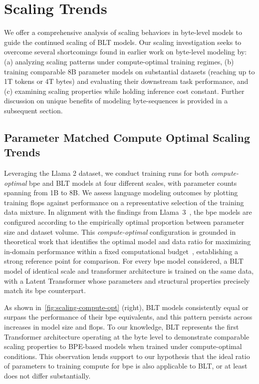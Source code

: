\section{Scaling Trends}
\label{section:scaling}

We offer a comprehensive analysis of scaling behaviors in byte-level models to guide the continued scaling of {\textsc BLT} models. Our scaling investigation seeks to overcome several shortcomings found in earlier work on byte-level modeling by: (a) analyzing scaling patterns under compute-optimal training regimes, (b) training comparable 8B parameter models on substantial datasets (reaching up to 1T tokens or 4T bytes) and evaluating their downstream task performance, and (c) examining scaling properties while holding inference cost constant. Further discussion on unique benefits of modeling byte-sequences is provided in a subsequent section.

\subsection{Parameter Matched Compute Optimal Scaling Trends}
\label{section:parameter-matched-scaling}
Leveraging the Llama 2 dataset, we conduct training runs for both \textit{compute-optimal} bpe and {\textsc BLT} models at four different scales, with parameter counts spanning from 1B to 8B. We assess language modeling outcomes by plotting training flops against performance on a representative selection of the training data mixture. In alignment with the findings from Llama~3~\citep{dubey2024llama}, the bpe models are configured according to the empirically optimal proportion between parameter size and dataset volume. This \textit{compute-optimal} configuration is grounded in theoretical work that identifies the optimal model and data ratio for maximizing in-domain performance within a fixed computational budget~\citep{hoffmann2022training}, establishing a strong reference point for comparison. For every bpe model considered, a {\textsc BLT} model of identical scale and transformer architecture is trained on the same data, with a Latent Transformer whose parameters and structural properties precisely match its bpe counterpart.

As shown in~\autoref{fig:scaling-compute-opt} (right), {\textsc BLT} models consistently equal or surpass the performance of their bpe equivalents, and this pattern persists across increases in model size and flops. To our knowledge, {\textsc BLT} represents the first Transformer architecture operating at the byte level to demonstrate comparable scaling properties to BPE-based models when trained under compute-optimal conditions. This observation lends support to our hypothesis that the ideal ratio of parameters to training compute for bpe is also applicable to {\textsc BLT}, or at least does not differ substantially.

